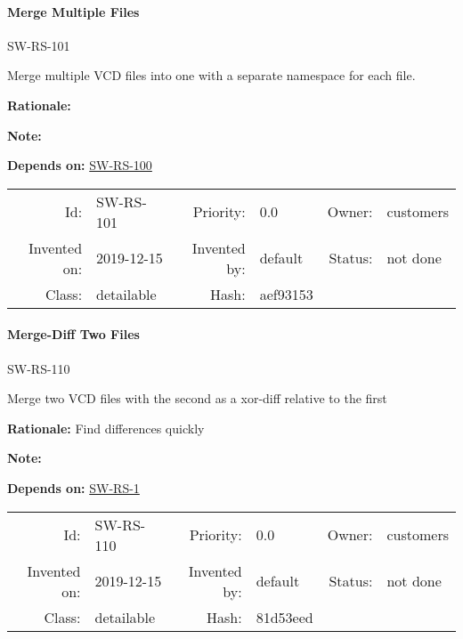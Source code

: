 \paragraph{Merge Multiple Files}

\hypertarget{SW-RS-101}{SW-RS-101} 
\label{SW-RS-101}

Merge multiple VCD files into one with a separate namespace for each file.

\textbf{Rationale:} 

\textbf{Note:} 



 \textbf{Depends on:}
 \hyperlink{SW-RS-100}{SW-RS-100} 




\par{\small \begin{center}
\begin{tabular}{rlrlrl}
   Id: & SW-RS-101               & Priority: & 0.0          & Owner: & customers \\
   Invented on: & 2019-12-15 & Invented by: & default & Status: & not done \\
   Class: & detailable & Hash: & aef93153
\end{tabular}\end{center}
}

\paragraph{Merge-Diff Two Files}

\hypertarget{SW-RS-110}{SW-RS-110} 
\label{SW-RS-110}

Merge two VCD files with the second as a xor-diff relative to the first

\textbf{Rationale:} Find differences quickly

\textbf{Note:} 



 \textbf{Depends on:}
 \hyperlink{SW-RS-1}{SW-RS-1} 




\par{\small \begin{center}
\begin{tabular}{rlrlrl}
   Id: & SW-RS-110               & Priority: & 0.0          & Owner: & customers \\
   Invented on: & 2019-12-15 & Invented by: & default & Status: & not done \\
   Class: & detailable & Hash: & 81d53eed
\end{tabular}\end{center}
}

